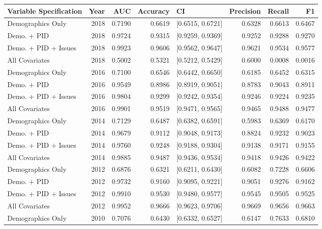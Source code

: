 \begin{table}[ht]
\centering
\begin{tabular}{lrrrlrrr}
  \toprule
Variable Specification & Year & AUC & Accuracy & CI & Precision & Recall & F1 \\ 
  \midrule
Demographics Only & 2018 & 0.7190 & 0.6619 & [0.6515, 0.6721] & 0.6328 & 0.6613 & 0.6467 \\ 
  Demo. + PID & 2018 & 0.9724 & 0.9315 & [0.9259, 0.9369] & 0.9252 & 0.9288 & 0.9270 \\ 
  Demo. + PID + Issues & 2018 & 0.9923 & 0.9606 & [0.9562, 0.9647] & 0.9621 & 0.9534 & 0.9577 \\ 
  All Covariates & 2018 & 0.5002 & 0.5321 & [0.5212, 0.5429] & 0.6000 & 0.0008 & 0.0016 \\ 
  Demographics Only & 2016 & 0.7100 & 0.6546 & [0.6442, 0.6650] & 0.6185 & 0.6452 & 0.6315 \\ 
  Demo. + PID & 2016 & 0.9549 & 0.8986 & [0.8919, 0.9051] & 0.8783 & 0.9043 & 0.8911 \\ 
  Demo. + PID + Issues & 2016 & 0.9804 & 0.9299 & [0.9242, 0.9354] & 0.9246 & 0.9224 & 0.9235 \\ 
  All Covariates & 2016 & 0.9901 & 0.9519 & [0.9471, 0.9565] & 0.9465 & 0.9488 & 0.9477 \\ 
  Demographics Only & 2014 & 0.7129 & 0.6487 & [0.6382, 0.6591] & 0.5983 & 0.6369 & 0.6170 \\ 
  Demo. + PID & 2014 & 0.9679 & 0.9112 & [0.9048, 0.9173] & 0.8824 & 0.9232 & 0.9023 \\ 
  Demo. + PID + Issues & 2014 & 0.9760 & 0.9248 & [0.9188, 0.9304] & 0.9138 & 0.9171 & 0.9155 \\ 
  All Covariates & 2014 & 0.9885 & 0.9487 & [0.9436, 0.9534] & 0.9418 & 0.9426 & 0.9422 \\ 
  Demographics Only & 2012 & 0.6876 & 0.6321 & [0.6211, 0.6430] & 0.6082 & 0.7228 & 0.6606 \\ 
  Demo. + PID & 2012 & 0.9732 & 0.9160 & [0.9095, 0.9221] & 0.9051 & 0.9276 & 0.9162 \\ 
  Demo. + PID + Issues & 2012 & 0.9910 & 0.9530 & [0.9480, 0.9577] & 0.9545 & 0.9505 & 0.9525 \\ 
  All Covariates & 2012 & 0.9952 & 0.9666 & [0.9623, 0.9706] & 0.9669 & 0.9656 & 0.9663 \\ 
  Demographics Only & 2010 & 0.7076 & 0.6430 & [0.6332, 0.6527] & 0.6147 & 0.7633 & 0.6810 \\ 

\end{tabular}
\end{table}
